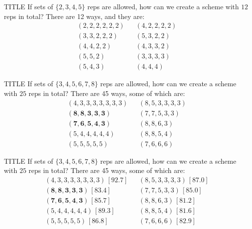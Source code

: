 \documentclass[11pt, aspectratio=149]{beamer}
\theoremstyle{plain}
\begin{document}
\begin{frame}[fragile, t]{TITLE}
	\vfill
	If sets of $\{2, 3, 4, 5 \}$ reps are allowed, how can we create a scheme with $12$ reps in total?
	\vfill
There are 12 ways, and they are:
	\vfill
	\begin{align*}
	(2, 2, 2, 2, 2, 2) &&
	(4, 2, 2, 2, 2) \\
	(3, 3, 2, 2, 2) &&
	(5, 3, 2, 2) \\
	(4, 4, 2, 2) &&
	(4, 3, 3, 2) \\
	(5, 5, 2) &&
	(3, 3, 3, 3) \\
	(5, 4, 3) &&
	(4, 4, 4)
	\end{align*}
	\vfill
\end{frame}



\begin{frame}[fragile, t]{TITLE}
	\vfill
	If sets of $\{3, 4, 5, 6, 7, 8 \}$ reps are allowed, how can we create a scheme with $25$ reps in total?
	\vfill
	There are 45 ways, some of which are:
	\vfill
	\begin{align*}
(4, 3, 3, 3, 3, 3, 3, 3)  &&
(8, 5, 3, 3, 3, 3)  \\
\mathbf{(8, 8, 3, 3, 3)} &&
(7, 7, 5, 3, 3) \\
\mathbf{(7, 6, 5, 4, 3)} &&
(8, 8, 6, 3)  \\
(5, 4, 4, 4, 4, 4)  &&
(8, 8, 5, 4) \\
(5, 5, 5, 5, 5) &&
(7, 6, 6, 6) 
	\end{align*}
	\vfill
\end{frame}


\begin{frame}[fragile, t]{TITLE}
	\vfill
	If sets of $\{3, 4, 5, 6, 7, 8 \}$ reps are allowed, how can we create a scheme with $25$ reps in total?
	\vfill
	There are 45 ways, some of which are:
	\vfill
	\begin{align*}
	(4, 3, 3, 3, 3, 3, 3, 3) \, [92.7] &&
	(8, 5, 3, 3, 3, 3)\,  [87.0] \\
	\mathbf{(8, 8, 3, 3, 3)}\,  [83.4] &&
	(7, 7, 5, 3, 3) \, [85.0] \\
	\mathbf{(7, 6, 5, 4, 3)} \, [85.7] &&
	(8, 8, 6, 3)\, [81.2] \\
	(5, 4, 4, 4, 4, 4) \, [89.3] &&
	(8, 8, 5, 4) \, [81.6] \\
	(5, 5, 5, 5, 5)\,  [86.8] &&
	(7, 6, 6, 6)\,  [82.9]
	\end{align*}
	\vfill
\end{frame}
\end{document}
